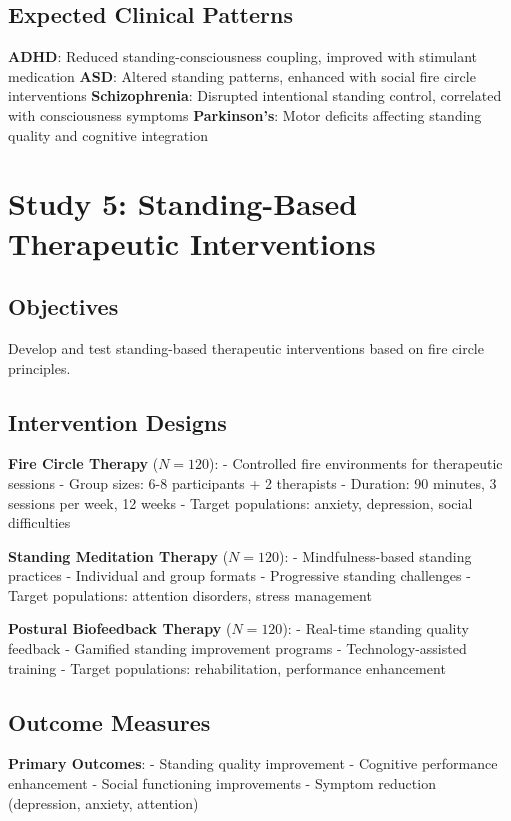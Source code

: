 \documentclass[12pt]{article}
\begin{document}
\subsection{Expected Clinical Patterns}

\textbf{ADHD}: Reduced standing-consciousness coupling, improved with stimulant medication
\textbf{ASD}: Altered standing patterns, enhanced with social fire circle interventions
\textbf{Schizophrenia}: Disrupted intentional standing control, correlated with consciousness symptoms
\textbf{Parkinson's}: Motor deficits affecting standing quality and cognitive integration

\section{Study 5: Standing-Based Therapeutic Interventions}

\subsection{Objectives}

Develop and test standing-based therapeutic interventions based on fire circle principles.

\subsection{Intervention Designs}

\textbf{Fire Circle Therapy} ($N = 120$):
- Controlled fire environments for therapeutic sessions
- Group sizes: 6-8 participants + 2 therapists
- Duration: 90 minutes, 3 sessions per week, 12 weeks
- Target populations: anxiety, depression, social difficulties

\textbf{Standing Meditation Therapy} ($N = 120$):
- Mindfulness-based standing practices
- Individual and group formats
- Progressive standing challenges
- Target populations: attention disorders, stress management

\textbf{Postural Biofeedback Therapy} ($N = 120$):
- Real-time standing quality feedback
- Gamified standing improvement programs
- Technology-assisted training
- Target populations: rehabilitation, performance enhancement

\subsection{Outcome Measures}

\textbf{Primary Outcomes}:
- Standing quality improvement
- Cognitive performance enhancement
- Social functioning improvements
- Symptom reduction (depression, anxiety, attention)
\end{document}
